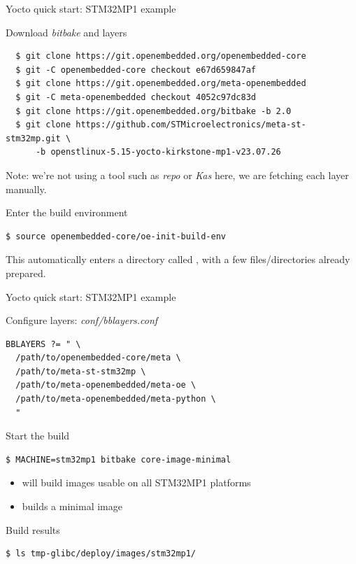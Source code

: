 \begin{frame}[fragile]{Yocto quick start: STM32MP1 example}
  \begin{block}{Download {\em bitbake} and layers}
    {\footnotesize
\begin{verbatim}
  $ git clone https://git.openembedded.org/openembedded-core
  $ git -C openembedded-core checkout e67d659847af
  $ git clone https://git.openembedded.org/meta-openembedded
  $ git -C meta-openembedded checkout 4052c97dc83d
  $ git clone https://git.openembedded.org/bitbake -b 2.0
  $ git clone https://github.com/STMicroelectronics/meta-st-stm32mp.git \
      -b openstlinux-5.15-yocto-kirkstone-mp1-v23.07.26
\end{verbatim}
    }
  \end{block}

  Note: we're not using a tool such as {\em repo} or {\em Kas} here,
  we are fetching each layer manually.

  \begin{block}{Enter the build environment}
    {\footnotesize
\begin{verbatim}
$ source openembedded-core/oe-init-build-env
\end{verbatim}
    }
  \end{block}

  This automatically enters a directory called \code{build/}, with a
  few files/directories already prepared.
\end{frame}

\begin{frame}[fragile]{Yocto quick start: STM32MP1 example}
  \begin{block}{Configure layers: {\em conf/bblayers.conf}}
    {\footnotesize
\begin{verbatim}
BBLAYERS ?= " \
  /path/to/openembedded-core/meta \
  /path/to/meta-st-stm32mp \
  /path/to/meta-openembedded/meta-oe \
  /path/to/meta-openembedded/meta-python \
  "
\end{verbatim}
    }
  \end{block}

  \begin{block}{Start the build}
    {\footnotesize
\begin{verbatim}
$ MACHINE=stm32mp1 bitbake core-image-minimal
\end{verbatim}
    }
  \end{block}

  \begin{itemize}
  \item \code{MACHINE=stm32mp1} will build images usable on all
    STM32MP1 platforms
  \item {} builds a minimal image
  \end{itemize}

  \begin{block}{Build results}
    {\footnotesize
\begin{verbatim}
$ ls tmp-glibc/deploy/images/stm32mp1/
\end{verbatim}
    }
  \end{block}
\end{frame}


